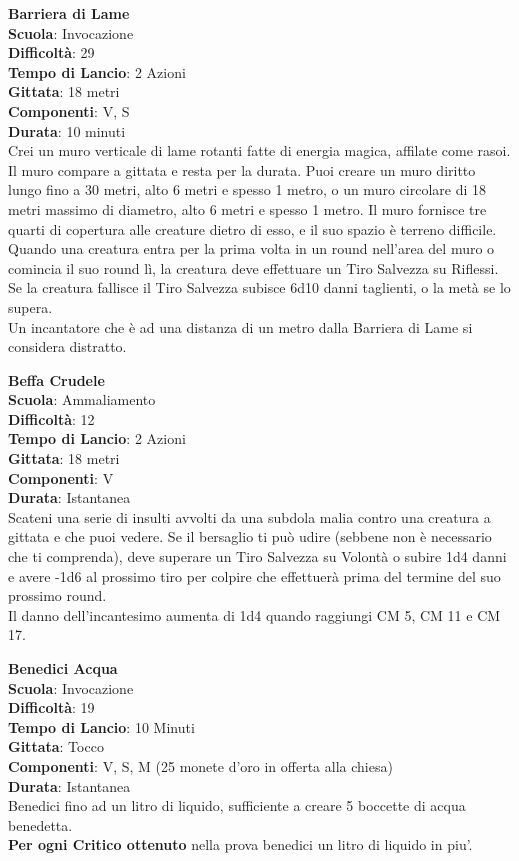 \begin{multicols}{2}
\medskip\textbf{Barriera di Lame}\\
\textbf{Scuola}: Invocazione\\
\textbf{Difficoltà}: 29\\
\textbf{Tempo di Lancio}: 2 Azioni\\
\textbf{Gittata}: 18 metri\\
\textbf{Componenti}: V, S\\
\textbf{Durata}: 10 minuti \\
Crei un muro verticale di lame rotanti fatte di energia magica, affilate come rasoi. Il muro compare a gittata e resta per la durata. Puoi creare un muro diritto lungo fino a 30 metri, alto 6 metri e spesso 1 metro, o un muro circolare di 18 metri massimo di diametro, alto 6 metri e spesso 1 metro. Il muro fornisce tre quarti di copertura alle creature dietro di esso, e il suo spazio è terreno difficile. \\
Quando una creatura entra per la prima volta in un round nell'area del muro o comincia il suo round lì, la creatura deve effettuare un Tiro Salvezza su Riflessi. Se la creatura fallisce il Tiro Salvezza subisce 6d10 danni taglienti, o la metà se lo supera.\\
Un incantatore che è ad una distanza di un metro dalla Barriera di Lame si considera distratto.

\medskip\textbf{Beffa Crudele}\\
\textbf{Scuola}: Ammaliamento\\
\textbf{Difficoltà}: 12\\
\textbf{Tempo di Lancio}: 2 Azioni\\
\textbf{Gittata}: 18 metri\\
\textbf{Componenti}: V\\
\textbf{Durata}: Istantanea\\
Scateni una serie di insulti avvolti da una subdola malia contro una creatura a gittata e che puoi vedere. Se il bersaglio ti può udire (sebbene non è necessario che ti comprenda), deve superare un Tiro Salvezza su Volontà o subire 1d4 danni e avere -1d6 al prossimo tiro per colpire che effettuerà prima del termine del suo prossimo round.\\
Il danno dell'incantesimo aumenta di 1d4 quando raggiungi CM 5, CM 11 e CM 17.

\medskip\textbf{Benedici Acqua}\\
\textbf{Scuola}: Invocazione\\
\textbf{Difficoltà}: 19\\
\textbf{Tempo di Lancio}: 10 Minuti\\
\textbf{Gittata}: Tocco\\
\textbf{Componenti}: V, S, M (25 monete d'oro in offerta alla chiesa)\\
\textbf{Durata}: Istantanea\\
Benedici fino ad un litro di liquido, sufficiente a creare 5 boccette di acqua benedetta.\\
\textbf{Per ogni Critico ottenuto} nella prova benedici un litro di liquido in piu'.\\


\end{multicols}
